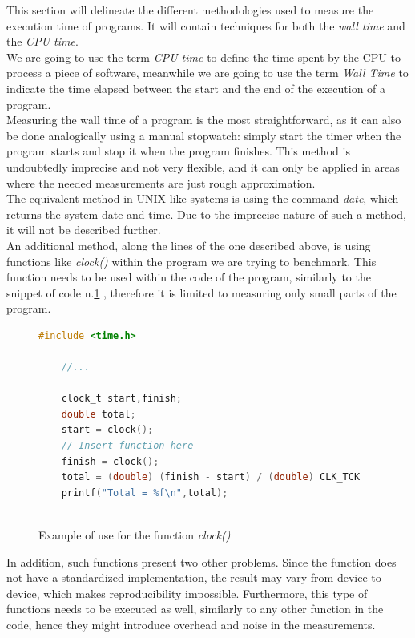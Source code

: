 This section will delineate the different methodologies used to measure the execution time of programs. It will contain techniques for both the \textit{wall time} and the \textit{CPU time}. \\
We are going to use the term  \textit{CPU time} to define the time spent by the CPU to process a piece of software, meanwhile we are going to use the term \textit{Wall Time} to indicate the time elapsed between the start and the end of the execution of a program.\\\hfill
Measuring the wall time of a program is the most straightforward, as it can also be done analogically using a manual stopwatch: simply start the timer when the program starts and stop it when the program finishes. This method is undoubtedly imprecise and not very flexible, and it can only be applied in areas where the needed measurements are just rough approximation.\cite{Stewart2001MeasuringET}\\
The equivalent method in UNIX-like systems is using the command \textit{date}, which returns the system date and time. Due to the imprecise nature of such a method, it will not be described further. \\
An additional method, along the lines of the one described above, is using functions like \textit{clock()} within the program we are trying to benchmark. This function needs to be used within the code of the program, similarly to the snippet of code n.\ref{fig:code} \cite{Stewart2001MeasuringET}, therefore it is limited to measuring only small parts of the program. \\
\begin{figure}
\begin{lstlisting}[language=C, label= code]
    #include <time.h>
    
    //...
    
    clock_t start,finish;
    double total;
    start = clock();
    // Insert function here
    finish = clock();
    total = (double) (finish - start) / (double) CLK_TCK
    printf("Total = %f\n",total);
    
\end{lstlisting}
\caption{Example of use for the function \textit{clock()}}
\label{fig:code}
\end{figure}
In addition, such functions present two other problems. Since the function does not have a standardized implementation, the result may vary from device to device, which makes reproducibility impossible. 
Furthermore, this type of functions needs to be executed as well, similarly to any other function in the code, hence they might introduce overhead and noise in the measurements. \\

